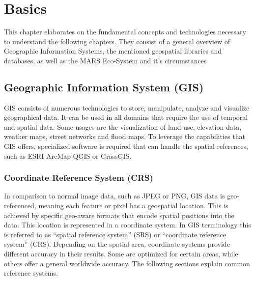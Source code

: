 
\chapter{Basics}
This chapter elaborates on the fundamental concepts and technologies necessary to understand the following chapters. They consist of a general overview of Geographic Information Systems, the mentioned geospatial libraries and databases, as well as the MARS Eco-System and it's circumstances



\section{Geographic Information System (GIS)}
GIS consists of numerous technologies to store, manipulate, analyze and visualize geographical data. It can be used in all domains that require the use of temporal and spatial data. Some usages are the visualization of land-use, elevation data, weather maps, street networks and flood maps. To leverage the capabilities that GIS offers, specialized software is required that can handle the spatial references, such as ESRI ArcMap QGIS or GrassGIS.


\subsection{Coordinate Reference System (CRS)}
In comparison to normal image data, such as JPEG or PNG, GIS data is geo-referenced, meaning each feature or pixel has a geospatial location. This is achieved by specific geo-aware formats that encode spatial positions into the data. This location is represented in a coordinate system. In GIS terminology this is referred to as \enquote{spatial reference system} (SRS) or \enquote{coordinate reference system} (CRS). Depending on the spatial area, coordinate systems provide different accuracy in their results. Some are optimized for certain areas, while others offer a general worldwide accuracy. The following sections explain common reference systems.

